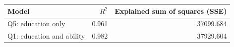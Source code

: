 \begin{center}
\begin{tabular}{lrr}
\hline
Model & $R^2$ & Explained sum of squares (SSE) \\
\hline
Q5: education only & 0.961 & 37099.684 \\
Q1: education and ability & 0.982 & 37929.604 \\
\hline
\end{tabular}
\end{center}
